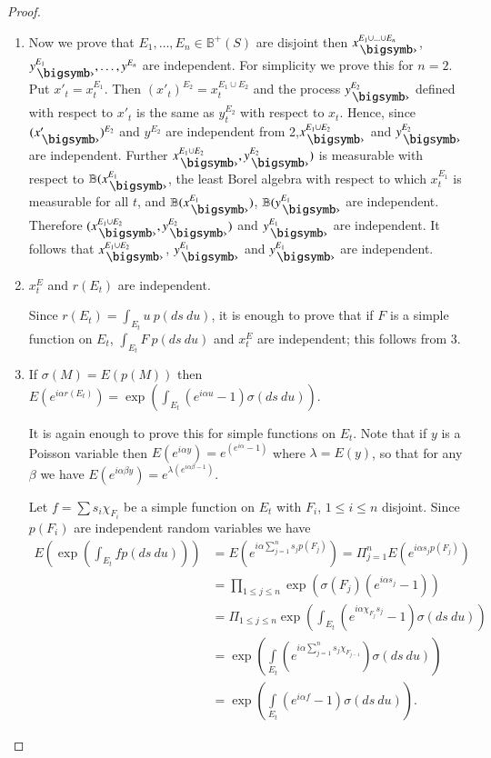 \begin{proof}
\begin{enumerate}
 \item Now we prove that  $E_1, \ldots , E_n \in \mathbb{B}^+ (S)$
   are disjoint then \break $x^{E_1 \cup \ldots \cup E_n}_{\bigdot}$, $y^{E_1}_{\bigdot}, \ldots , y^{E_n}$ are independent. For simplicity we prove
   this for $n=2$. Put $x'_t = x^{E_1}_t$. Then $(x'_t)^{E_2}= x^{E_1
     \cup E_2}_t$ and the process $y^{E_2}_{\bigdot}$ defined with respect to
   $x'_t$ is the same as $y^{E_2}_t$ with respect to $x_t$. Hence,
   since $(x'_{\bigdot})^{E_2}$ and $y^{E_2}$ are independent from
   2,\pageoriginale $x^{E_1\cup E_2}_{\bigdot}$ and $y^{E_2}_{\bigdot}$
   are independent. Further $x^{E_1 \cup E_2}_{\bigdot},
   y^{E_2}_{\bigdot})$ is measurable with respect to
   $\mathbb{B}(x^{E_1}_{\bigdot}$, the
   least Borel algebra with respect to which $x^{E_1}_t$ is measurable
   for all $t$, and $\mathbb{B}(x^{E_1}_{\bigdot})$,
   $\mathbb{B}(y^{E_1}_{\bigdot}$ are 
   independent. Therefore $(x^{E_1 \cup E_2}_{\bigdot},
   y^{E_2}_{\bigdot})$ and $y^{E_1}_{\bigdot}$ 
   are independent. It follows that $x^{E_1 \cup E_2}_{\bigdot}$,
   $y^{E_1}_{\bigdot}$  and
   $y^{E_1}_{\bigdot}$ are independent.
 
\item $x^E_t$ and $r(E_t)$ are independent.
   
   Since $r(E_t) = \int_{E_t} u\ p (ds\ du)$, it is enough to prove that
   if $F$ is a simple function on $E_t$, $\int_{E_t} F\ p (ds\ du)$ and
   $x^E_t$ are independent; this follows from $3$.
 
 \item If $\sigma (M) = E(p(M))$ then $E(e^{i \alpha r (E_t)}) =
   \exp \left(\int_{E_t} (e^{i \alpha u}-1) \sigma (ds\ du)\right)$. 
   
   It is again enough to prove this for simple functions on $E_t$. Note
   that if $y$ is a Poisson variable then $E(e^{i \alpha y}) =
   e^{(e^{i\alpha} -1)}$  where $\lambda = E(y)$, so that for any $\beta$ we
   have $E(e^{i \alpha \beta y})= e^{\lambda (e^{i \alpha \beta -1})}$. 
   
   Let $f=  \sum s_i \chi_{F_i}$ be a simple function on $E_t$ with $F_i$,
   $1 \le i \le n$ disjoint. Since $p(F_i)$ are independent random
   variables we have  
   \begin{align*}
     E \left( \exp\left( \int_{E_t} f p( ds\ du) \right)\right) & = E
     \left(e^{i \alpha \sum\limits_{j=1}^n 
       s_j p(F_j)}\right) = \Pi_{j=1}^n E(e^{i \alpha s_j p (F_j)}) \\
     &= \prod_{1 \le j \le n} \exp \left( \sigma (F_j) (e^{i \alpha
       s_j}-1)\right)\\
     & = \Pi_{1 \le j \le n} \exp \left( \int_{E_t} (e^{i \alpha \chi_{F_j}s_j}-1)
     \sigma (ds\ du)\right) \\ 
     &= \exp \left(\int\limits_{E_t} (e^{i \alpha \sum\limits_{j=1}^n s_j \chi_{F_{j-1}}}) \sigma (ds\ du)\right)\\ 
     & = \exp \left(\int\limits_{E_t}(e^{i \alpha f}-1) \sigma
     (ds\ du)\right). 
   \end{align*}
    

\end{enumerate}
\end{proof}
